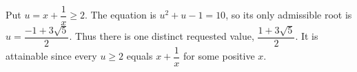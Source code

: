 Put $u=x+\dfrac{1}{x}\ge2$. The equation is $u^2+u-1=10$, so its only admissible root is $u=\dfrac{-1+3\sqrt5}{2}$. Thus there is one distinct requested value, $\boxed{\dfrac{1+3\sqrt5}{2}}$. It is attainable since every $u\ge2$ equals $x+\dfrac{1}{x}$ for some positive $x$.
